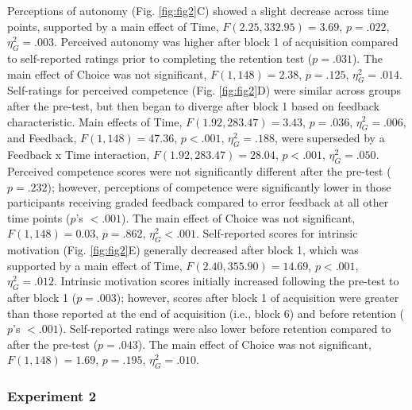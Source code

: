 \documentclass[
  man, donotrepeattitle,floatsintext]{apa7}
\begin{document}
Perceptions of autonomy (Fig. \ref{fig:fig2}C) showed a slight decrease across time points, supported by a main effect of Time, \(F(2.25,332.95) = 3.69\), \(p = .022\), \(\eta_{G}^2 = .003\). Perceived autonomy was higher after block 1 of acquisition compared to self-reported ratings prior to completing the retention test (\(p = .031\)). The main effect of Choice was not significant, \(F(1,148) = 2.38\), \(p = .125\), \(\eta_{G}^2 = .014\). Self-ratings for perceived competence (Fig. \ref{fig:fig2}D) were similar across groups after the pre-test, but then began to diverge after block 1 based on feedback characteristic. Main effects of Time, \(F(1.92, 283.47) = 3.43\), \(p = .036\), \(\eta_{G}^2 = .006\), and Feedback, \(F(1,148) = 47.36\), \(p < .001\), \(\eta_{G}^2 = .188\), were superseded by a Feedback x Time interaction, \(F(1.92, 283.47) = 28.04\), \(p < .001\), \(\eta_{G}^2 = .050\). Perceived competence scores were not significantly different after the pre-test (\(p = .232\)); however, perceptions of competence were significantly lower in those participants receiving graded feedback compared to error feedback at all other time points (\(p\)'s \(< .001\)). The main effect of Choice was not significant, \(F(1,148) = 0.03\), \(p = .862\), \(\eta_{G}^2 < .001\). Self-reported scores for intrinsic motivation (Fig. \ref{fig:fig2}E) generally decreased after block 1, which was supported by a main effect of Time, \(F(2.40,355.90) = 14.69\), \(p < .001\), \(\eta_{G}^2 = .012\). Intrinsic motivation scores initially increased following the pre-test to after block 1 (\(p = .003\)); however, scores after block 1 of acquisition were greater than those reported at the end of acquisition (i.e., block 6) and before retention (\(p\)'s \(< .001\)). Self-reported ratings were also lower before retention compared to after the pre-test (\(p = .043\)). The main effect of Choice was not significant, \(F(1,148) = 1.69\), \(p = .195\), \(\eta_{G}^2 = .010\).

\hypertarget{experiment-2-4}{%
\subsubsection{Experiment 2}\label{experiment-2-4}}
\end{document}
